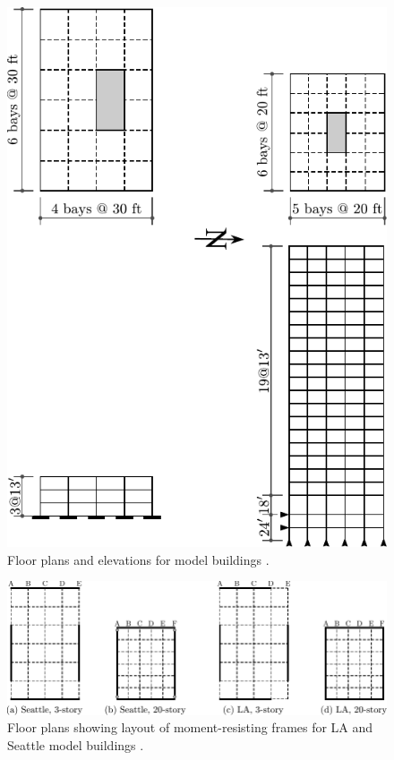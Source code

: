 \documentclass[onecolumn, fleqn]{article}
\begin{document}
\begin{figure}[H]
	\centering \includegraphics[width=0.45\linewidth]{SAC_floor_plans.pdf}
	\caption{Floor plans and elevations for model buildings \citep{FEMA335c2000}.}
	\label{fig:floor_plan_elev}
\end{figure}


\begin{figure}[H]
	\centering \includegraphics[width=0.8\linewidth]{SAC_moment_frame_LASE.pdf}
	\caption{Floor plans showing layout of moment-resisting frames for LA and Seattle model buildings \citep{FEMA335c2000}.}
	\label{fig:MRF_LASE}
\end{figure}
\end{document}
